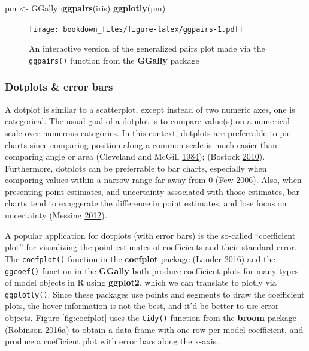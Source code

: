 \documentclass[12pt,]{isuthesis}
\newenvironment{Shaded}{\begin{snugshade}}{\end{snugshade}}
\newcommand{\KeywordTok}[1]{\textcolor[rgb]{0.13,0.29,0.53}{\textbf{{#1}}}}
\newcommand{\StringTok}[1]{\textcolor[rgb]{0.31,0.60,0.02}{{#1}}}
\newcommand{\NormalTok}[1]{{#1}}
\begin{document}
\begin{Shaded}
\begin{Highlighting}[]
\NormalTok{pm <-}\StringTok{ }\NormalTok{GGally::}\KeywordTok{ggpairs}\NormalTok{(iris)}
\KeywordTok{ggplotly}\NormalTok{(pm)}
\end{Highlighting}
\end{Shaded}

\begin{figure}[htbp]
\centering
\texttt{[image: bookdown\_files/figure-latex/ggpairs-1.pdf]}
\caption{\label{fig:ggpairs}An interactive version of the generalized pairs
plot made via the \texttt{ggpairs()} function from the \textbf{GGally}
package}
\end{figure}

\subsubsection{Dotplots \& error bars}\label{dotplots-error-bars}

A dotplot is similar to a scatterplot, except instead of two numeric
axes, one is categorical. The usual goal of a dotplot is to compare
value(s) on a numerical scale over numerous categories. In this context,
dotplots are preferrable to pie charts since comparing position along a
common scale is much easier than comparing angle or area (Cleveland and
McGill \protect\hyperlink{ref-graphical-perception}{1984}); (Bostock
\protect\hyperlink{ref-crowdsourcing-graphical-perception}{2010}).
Furthermore, dotplots can be preferrable to bar charts, especially when
comparing values within a narrow range far away from 0 (Few
\protect\hyperlink{ref-few-values}{2006}). Also, when presenting point
estimates, and uncertainty associated with those estimates, bar charts
tend to exaggerate the difference in point estimates, and lose focus on
uncertainty (Messing \protect\hyperlink{ref-messing}{2012}).

A popular application for dotplots (with error bars) is the so-called
``coefficient plot'' for visualizing the point estimates of coefficients
and their standard error. The \texttt{coefplot()} function in the
\textbf{coefplot} package (Lander
\protect\hyperlink{ref-coefplot}{2016}) and the \texttt{ggcoef()}
function in the \textbf{GGally} both produce coefficient plots for many
types of model objects in R using \textbf{ggplot2}, which we can
translate to plotly via \texttt{ggplotly()}. Since these packages use
points and segments to draw the coefficient plots, the hover information
is not the best, and it'd be better to use
\href{https://plot.ly/r/reference/\#scatter-error_x}{error objects}.
Figure \ref{fig:coefplot} uses the \texttt{tidy()} function from the
\textbf{broom} package (Robinson
\protect\hyperlink{ref-broom}{2016}\protect\hyperlink{ref-broom}{a}) to
obtain a data frame with one row per model coefficient, and produce a
coefficient plot with error bars along the x-axis.
\end{document}
